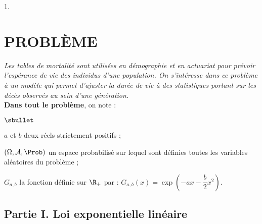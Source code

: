 \begin{noliste}{1.}




\end{noliste}




\section*{PROBLÈME}

\noindent %
{\it Les tables de mortalité sont utilisées en démographie et en
  actuariat pour prévoir l'espérance de vie des individus d'une
  population. On s'intéresse dans ce problème à un modèle qui permet
  d'ajuster la durée de vie à des statistiques portant sur les décès
  observés au sein d'une génération.}\\
{\bf Dans tout le problème}, on note :
\begin{noliste}{$\sbullet$}
\item $a$ et $b$ deux réels strictement positifs ;
\item $(\Omega,\mathcal{A},\Prob)$ un espace probabilisé sur lequel sont
  définies toutes les variables aléatoires du problème ;
\item $G_{a,b}$ la fonction définie sur $\R_+$ par :
  $G_{a,b}(x)=\exp\left(-ax-\dfrac{b}{2}x^2\right)$.
\end{noliste}

\subsection*{Partie I. Loi exponentielle linéaire}

